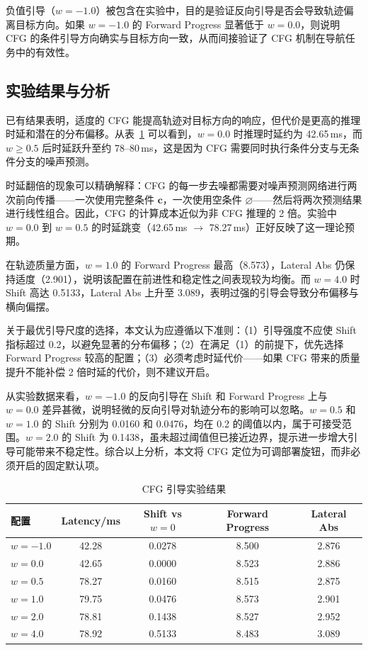 负值引导（$w=-1.0$）被包含在实验中，目的是验证反向引导是否会导致轨迹偏离目标方向。如果 $w=-1.0$ 的 Forward Progress 显著低于 $w=0.0$，则说明 CFG 的条件引导方向确实与目标方向一致，从而间接验证了 CFG 机制在导航任务中的有效性。

\subsection{实验结果与分析}

已有结果表明，适度的 CFG 能提高轨迹对目标方向的响应，但代价是更高的推理时延和潜在的分布偏移。从表~\ref{tab:cfg-results} 可以看到，$w=0.0$ 时推理时延约为 42.65\,ms，而 $w \geq 0.5$ 后时延跃升至约 78--80\,ms，这是因为 CFG 需要同时执行条件分支与无条件分支的噪声预测。

时延翻倍的现象可以精确解释：CFG 的每一步去噪都需要对噪声预测网络进行两次前向传播——一次使用完整条件 $\mathbf{c}$，一次使用空条件 $\varnothing$——然后将两次预测结果进行线性组合。因此，CFG 的计算成本近似为非 CFG 推理的 2 倍。实验中 $w=0.0$ 到 $w=0.5$ 的时延跳变（42.65\,ms $\to$ 78.27\,ms）正好反映了这一理论预期。

在轨迹质量方面，$w=1.0$ 的 Forward Progress 最高（8.573），Lateral Abs 仍保持适度（2.901），说明该配置在前进性和稳定性之间表现较为均衡。而 $w=4.0$ 时 Shift 高达 0.5133，Lateral Abs 上升至 3.089，表明过强的引导会导致分布偏移与横向偏摆。

关于最优引导尺度的选择，本文认为应遵循以下准则：（1）引导强度不应使 Shift 指标超过 0.2，以避免显著的分布偏移；（2）在满足（1）的前提下，优先选择 Forward Progress 较高的配置；（3）必须考虑时延代价——如果 CFG 带来的质量提升不能补偿 2 倍时延的代价，则不建议开启。

从实验数据来看，$w=-1.0$ 的反向引导在 Shift 和 Forward Progress 上与 $w=0.0$ 差异甚微，说明轻微的反向引导对轨迹分布的影响可以忽略。$w=0.5$ 和 $w=1.0$ 的 Shift 分别为 0.0160 和 0.0476，均在 0.2 的阈值以内，属于可接受范围。$w=2.0$ 的 Shift 为 0.1438，虽未超过阈值但已接近边界，提示进一步增大引导可能带来不稳定性。综合以上分析，本文将 CFG 定位为可调部署旋钮，而非必须开启的固定默认项。

\begin{table}[htbp]
    \centering
    \caption{CFG 引导实验结果}
    \label{tab:cfg-results}
    \begin{tabular}{lcccc}
        \toprule
        配置 & Latency/ms & Shift vs $w=0$ & Forward Progress & Lateral Abs \\
        \midrule
        $w=-1.0$ & 42.28 & 0.0278 & 8.500 & 2.876 \\
        $w=0.0$ & 42.65 & 0.0000 & 8.523 & 2.886 \\
        $w=0.5$ & 78.27 & 0.0160 & 8.515 & 2.875 \\
        $w=1.0$ & 79.75 & 0.0476 & 8.573 & 2.901 \\
        $w=2.0$ & 78.81 & 0.1438 & 8.527 & 2.952 \\
        $w=4.0$ & 78.92 & 0.5133 & 8.483 & 3.089 \\
        \bottomrule
    \end{tabular}
\end{table}


